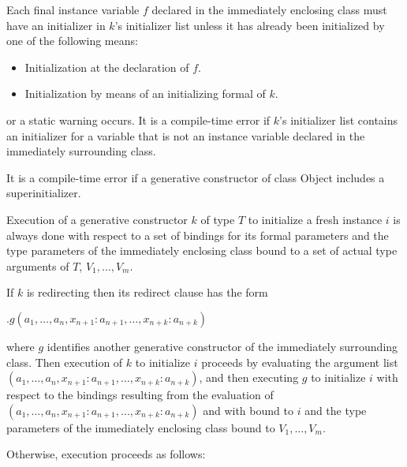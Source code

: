 \documentclass{article}
\newcommand{\code}[1]{{\sf #1}}
\begin{document}
\LMHash{}
Each final instance variable $f$ declared in the immediately enclosing class must have an initializer in $k$'s initializer list unless it has already been initialized by one of the following means:
 \begin{itemize}
 \item Initialization at the declaration of $f$.
 \item Initialization by means of an initializing formal of $k$.
 \end{itemize}

or a static warning occurs. It is a compile-time error if $k$'s initializer list contains an initializer for a variable that is not an instance variable declared in the immediately surrounding class.



\LMHash{}
It is a compile-time error if a generative constructor of class \code{Object} includes a superinitializer.

\LMHash{}
Execution of a generative constructor $k$ of type $T$ to initialize a fresh instance $i$
is always done with respect to a set of bindings for its formal parameters
and the type parameters of the immediately enclosing class bound to a set of actual type arguments of $T$, $V_1, \ldots , V_m$.


\LMHash{}
If $k$ is redirecting then its redirect clause has the form

\THIS{}$.g(a_1, \ldots , a_n, x_{n+1}: a_{n+1}, \ldots , x_{n+k}: a_{n+k})$

where $g$ identifies another  generative constructor of the immediately surrounding class. Then execution of $k$ to initialize $i$ proceeds by evaluating the argument list $(a_1, \ldots , a_n, x_{n+1}: a_{n+1}, \ldots , x_{n+k}: a_{n+k})$, and then executing $g$ to initialize $i$ with respect to the bindings resulting from the evaluation of $(a_1, \ldots , a_n, x_{n+1}: a_{n+1}, \ldots , x_{n+k}: a_{n+k})$ and with  \THIS{} bound to $i$ and the type parameters of the immediately enclosing class bound to $V_1, \ldots , V_m$.

\LMHash{}
Otherwise, execution  proceeds as follows:
\end{document}
